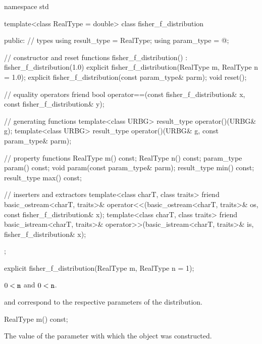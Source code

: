 %
%
\begin{codeblock}
namespace std {
  template<class RealType = double>
  class fisher_f_distribution {
  public:
    // types
    using result_type = RealType;
    using param_type  = @\unspec@;

    // constructor and reset functions
    fisher_f_distribution() : fisher_f_distribution(1.0) {}
    explicit fisher_f_distribution(RealType m, RealType n = 1.0);
    explicit fisher_f_distribution(const param_type& parm);
    void reset();

    // equality operators
    friend bool operator==(const fisher_f_distribution& x, const fisher_f_distribution& y);

    // generating functions
    template<class URBG>
      result_type operator()(URBG& g);
    template<class URBG>
      result_type operator()(URBG& g, const param_type& parm);

    // property functions
    RealType m() const;
    RealType n() const;
    param_type param() const;
    void param(const param_type& parm);
    result_type min() const;
    result_type max() const;

    // inserters and extractors
    template<class charT, class traits>
      friend basic_ostream<charT, traits>&
        operator<<(basic_ostream<charT, traits>& os, const fisher_f_distribution& x);
    template<class charT, class traits>
      friend basic_istream<charT, traits>&
        operator>>(basic_istream<charT, traits>& is, fisher_f_distribution& x);
  };
}
\end{codeblock}


%
\begin{itemdecl}
explicit fisher_f_distribution(RealType m, RealType n = 1);
\end{itemdecl}

\begin{itemdescr}
\pnum
\expects
$0 < \tcode{m}$ and $0 < \tcode{n}$.

\pnum
\remarks
{} and 
correspond to the respective parameters of the distribution.
\end{itemdescr}

%
\begin{itemdecl}
RealType m() const;
\end{itemdecl}

\begin{itemdescr}
\pnum
\returns
The value of the  parameter
 with which the object was constructed.
\end{itemdescr}

